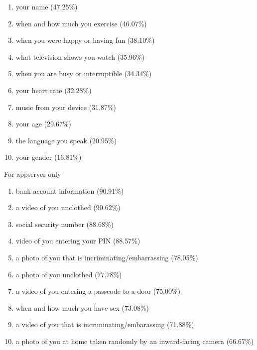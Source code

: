 \documentclass{acm_proc_article-sp}
\begin{document}
\begin{enumerate} \itemsep1pt \parskip0pt 
  \setcounter{enumi}{63}
  \item your name (47.25\%)
  \item when and how much you exercise (46.07\%)
  \item when you were happy or having fun (38.10\%)
  \item what television shows you watch (35.96\%)
  \item when you are busy or interruptible (34.34\%)
  \item your heart rate (32.28\%)
  \item music from your device (31.87\%)
  \item your age (29.67\%)
  \item the language you speak (20.95\%)
  \item your gender (16.81\%) \\[-.8cm]
\end{enumerate}

For appserver only  \\[-.8cm]

\begin{enumerate} \itemsep1pt \parskip0pt 
  \item bank account information (90.91\%)
  \item a video of you unclothed (90.62\%)
  \item social security number (88.68\%)
  \item video of you entering your PIN (88.57\%)
  \item a photo of you that is incriminating/embarrassing (78.05\%)
  \item a photo of you unclothed (77.78\%)
  \item a video of you entering a passcode to a door (75.00\%)
  \item when and how much you have sex (73.08\%)
  \item a video of you that is incriminating/embarassing (71.88\%)
  \item a photo of you at home taken randomly by an inward-facing camera (66.67\%)  \\[-.8cm]
\end{enumerate}
\end{document}
